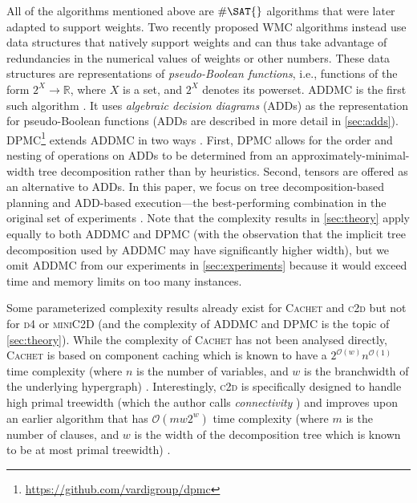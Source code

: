 \documentclass{article}
\theoremstyle{definition}
\theoremstyle{remark}
\begin{document}
All of the algorithms mentioned above are $\#\SAT{}$ algorithms that were later
adapted to support weights. Two recently proposed \textsf{WMC} algorithms
instead use data structures that natively support weights and can thus take
advantage of redundancies in the numerical values of weights or other numbers.
These data structures are representations of \emph{pseudo-Boolean functions},
i.e., functions of the form $2^X \to \mathbb{R}$, where $X$ is a set, and $2^X$
denotes its powerset. \textsc{ADDMC} is the first such algorithm
\cite{DBLP:conf/aaai/DudekPV20}. It uses \emph{algebraic decision diagrams}
(ADDs) \cite{DBLP:journals/fmsd/BaharFGHMPS97} as the representation for
pseudo-Boolean functions (ADDs are described in more detail in \cref{sec:adds}).
\textsc{DPMC}\footnote{\url{https://github.com/vardigroup/dpmc}} extends
\textsc{ADDMC} in two ways \cite{DBLP:conf/cp/DudekPV20}. First, \textsc{DPMC}
allows for the order and nesting of operations on ADDs to be determined from an
approximately-minimal-width tree decomposition rather than by heuristics.
Second, tensors are offered as an alternative to ADDs. In this paper, we focus
on tree decomposition-based planning and ADD-based execution---the
best-performing combination in the original set of experiments
\cite{DBLP:conf/cp/DudekPV20}. Note that the complexity results in
\cref{sec:theory} apply equally to both \textsc{ADDMC} and \textsc{DPMC} (with
the observation that the implicit tree decomposition used by \textsc{ADDMC} may
have significantly higher width), but we omit \textsc{ADDMC} from our
experiments in \cref{sec:experiments} because it would exceed time and memory
limits on too many instances.

Some parameterized complexity results already exist for \textsc{Cachet}
\cite{DBLP:conf/sat/SangBBKP04} and \textsc{c2d}
\cite{DBLP:conf/ecai/Darwiche04} but not for \textsc{d4}
\cite{DBLP:conf/ijcai/LagniezM17} or \textsc{miniC2D}
\cite{DBLP:conf/ijcai/OztokD15} (and the complexity of \textsc{ADDMC}
\cite{DBLP:conf/aaai/DudekPV20} and \textsc{DPMC} \cite{DBLP:conf/cp/DudekPV20}
is the topic of \cref{sec:theory}). While the complexity of \textsc{Cachet} has
not been analysed directly, \textsc{Cachet} is based on component caching which
is known to have a $2^{\mathcal{O}(w)}n^{\mathcal{O}(1)}$ time complexity (where
$n$ is the number of variables, and $w$ is the branchwidth of the underlying
hypergraph) \cite{DBLP:journals/jair/BacchusDP09,DBLP:conf/sat/SangBBKP04}.
Interestingly, \textsc{c2d} is specifically designed to handle high primal
treewidth (which the author calls \emph{connectivity}
\cite{DBLP:conf/ijcai/Darwiche99}) and improves upon an earlier algorithm that
has $\mathcal{O}(mw2^w)$ time complexity (where $m$ is the number of clauses,
and $w$ is the width of the decomposition tree which is known to be at most
primal treewidth)
\cite{DBLP:journals/jacm/Darwiche01,DBLP:conf/ecai/Darwiche04}.
\end{document}
